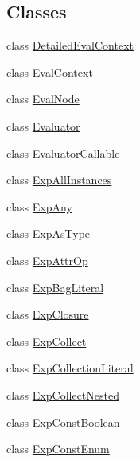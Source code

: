 \subsection*{Classes}
\begin{DoxyCompactItemize}
\item 
class \hyperlink{classorg_1_1tzi_1_1use_1_1uml_1_1ocl_1_1expr_1_1_detailed_eval_context}{Detailed\-Eval\-Context}
\item 
class \hyperlink{classorg_1_1tzi_1_1use_1_1uml_1_1ocl_1_1expr_1_1_eval_context}{Eval\-Context}
\item 
class \hyperlink{classorg_1_1tzi_1_1use_1_1uml_1_1ocl_1_1expr_1_1_eval_node}{Eval\-Node}
\item 
class \hyperlink{classorg_1_1tzi_1_1use_1_1uml_1_1ocl_1_1expr_1_1_evaluator}{Evaluator}
\item 
class \hyperlink{classorg_1_1tzi_1_1use_1_1uml_1_1ocl_1_1expr_1_1_evaluator_callable}{Evaluator\-Callable}
\item 
class \hyperlink{classorg_1_1tzi_1_1use_1_1uml_1_1ocl_1_1expr_1_1_exp_all_instances}{Exp\-All\-Instances}
\item 
class \hyperlink{classorg_1_1tzi_1_1use_1_1uml_1_1ocl_1_1expr_1_1_exp_any}{Exp\-Any}
\item 
class \hyperlink{classorg_1_1tzi_1_1use_1_1uml_1_1ocl_1_1expr_1_1_exp_as_type}{Exp\-As\-Type}
\item 
class \hyperlink{classorg_1_1tzi_1_1use_1_1uml_1_1ocl_1_1expr_1_1_exp_attr_op}{Exp\-Attr\-Op}
\item 
class \hyperlink{classorg_1_1tzi_1_1use_1_1uml_1_1ocl_1_1expr_1_1_exp_bag_literal}{Exp\-Bag\-Literal}
\item 
class \hyperlink{classorg_1_1tzi_1_1use_1_1uml_1_1ocl_1_1expr_1_1_exp_closure}{Exp\-Closure}
\item 
class \hyperlink{classorg_1_1tzi_1_1use_1_1uml_1_1ocl_1_1expr_1_1_exp_collect}{Exp\-Collect}
\item 
class \hyperlink{classorg_1_1tzi_1_1use_1_1uml_1_1ocl_1_1expr_1_1_exp_collection_literal}{Exp\-Collection\-Literal}
\item 
class \hyperlink{classorg_1_1tzi_1_1use_1_1uml_1_1ocl_1_1expr_1_1_exp_collect_nested}{Exp\-Collect\-Nested}
\item 
class \hyperlink{classorg_1_1tzi_1_1use_1_1uml_1_1ocl_1_1expr_1_1_exp_const_boolean}{Exp\-Const\-Boolean}
\item 
class \hyperlink{classorg_1_1tzi_1_1use_1_1uml_1_1ocl_1_1expr_1_1_exp_const_enum}{Exp\-Const\-Enum}
\item 

\end{DoxyCompactItemize}
